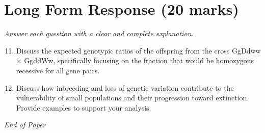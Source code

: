 \documentclass[12pt]{article}
\begin{document}
\section*{Long Form Response (20 marks)}
\textit{Answer each question with a clear and complete explanation.}
\begin{enumerate}[label=\arabic*.]
\setcounter{enumi}{10}
\item Discuss the expected genotypic ratios of the offspring from the cross GgDdww \ensuremath{\times} GgddWw, specifically focusing on the fraction that would be homozygous recessive for all gene pairs.
\item Discuss how inbreeding and loss of genetic variation contribute to the vulnerability of small populations and their progression toward extinction. Provide examples to support your analysis.
\end{enumerate}

\vfill
\noindent\textit{End of Paper}
\end{document}
